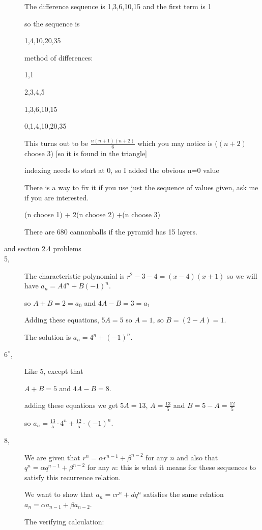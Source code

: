 \documentclass[12pt]{article}
\begin{document}
\begin{description}
The difference sequence is 1,3,6,10,15 and the first term  is 1

so the sequence is

1,4,10,20,35

method of differences:

1,1

2,3,4,5

1,3,6,10,15

0,1,4,10,20,35

This turns out to be $\frac{n(n+1)(n+2)}6$ which you may notice is \newline ($(n+2)$ choose 3) [so it is found in the triangle]

indexing needs to start at 0, so I added the obvious n=0 value

There is a way to fix it if you use just the sequence of values given, ask me if you are interested.

(n choose 1) + 2(n choose 2) +(n choose 3)

There are 680 cannonballs if the pyramid has 15 layers.



\item[ and section 2.4 problems ]

\item[5,]  The characteristic polynomial is $r^2-3-4 = (x-4)(x+1)$ so we will have $a_n = A4^n+B(-1)^n$.

so $A+B = 2 = a_0$ and $4A-B = 3 = a_1$

Adding these equations, $5A=5$ so $A=1$, so $B=(2-A)=1$.

The solution is $a_n = 4^n + (-1)^n$.

\item[ 6$^*$, ]   Like 5, except that

$A+B=5$ and $4A-B=8$.

adding these equations we get $5A = 13$, $A = \frac{13}5$ and $B = 5-A = \frac {12}5$

so $a_n = \frac{13}5\cdot 4^n +\frac{12}5 \cdot (-1)^n$.

\item[8,]  We are given that $r^n = \alpha r^{n-1} + \beta^{n-2}$ for any $n$ and also that
$q^n = \alpha q^{n-1} + \beta^{n-2}$ for any $n$:  this is what it means for these sequences to satisfy this recurrence relation.

We want to show that $a_n = cr^n + d q^n$ satisfies the same relation $a_n = \alpha a_{n-1}+\beta a_{n-2}$.

The verifying calculation:


\end{description}
\end{document}
